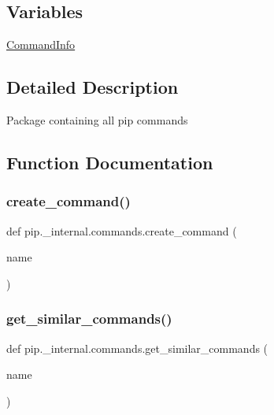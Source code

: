 \subsection*{Variables}
\begin{DoxyCompactItemize}
\item 
\hyperlink{namespacepip_1_1__internal_1_1commands_aef14abe5e957641834ca4926ec925cca}{Command\+Info}
\end{DoxyCompactItemize}


\subsection{Detailed Description}
\begin{DoxyVerb}Package containing all pip commands
\end{DoxyVerb}
 

\subsection{Function Documentation}
\mbox{\label{namespacepip_1_1__internal_1_1commands_a47ea9893916b8604fc2ac555703b0670}} 
\subsubsection{\texorpdfstring{create\+\_\+command()}{create\_command()}}
{\footnotesize\ttfamily def pip.\+\_\+internal.\+commands.\+create\+\_\+command (\begin{DoxyParamCaption}\item[{}]{name }\end{DoxyParamCaption})}

\mbox{\label{namespacepip_1_1__internal_1_1commands_aa76da06e703ecf6a505bcd08f64bc808}} 
\subsubsection{\texorpdfstring{get\+\_\+similar\+\_\+commands()}{get\_similar\_commands()}}
{\footnotesize\ttfamily def pip.\+\_\+internal.\+commands.\+get\+\_\+similar\+\_\+commands (\begin{DoxyParamCaption}\item[{}]{name }\end{DoxyParamCaption})}



